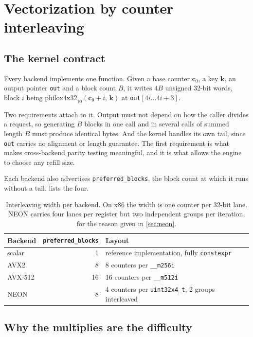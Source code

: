 \documentclass[acmsmall,screen,review]{acmart}
\theoremstyle{acmdefinition}
\newcommand{\ctr}{\mathbf{c}}
\newcommand{\key}{\mathbf{k}}
\newcommand{\code}[1]{\texttt{#1}}
\begin{document}
\section{Vectorization by counter interleaving}\label{sec:simd}

\subsection{The kernel contract}

Every backend implements one function. Given a base counter $\ctr_0$, a key
$\key$, an output pointer \code{out} and a block count $B$, it writes $4B$
unsigned 32-bit words, block $i$ being
$\mathrm{philox4x32}_{10}(\ctr_0 + i,\, \key)$ at \code{out}$[4i \ldots 4i+3]$.

Two requirements attach to it. Output must not depend on how the caller divides
a request, so generating $B$ blocks in one call and in several calls of
summed length $B$ must produce identical bytes. And the kernel handles its own
tail, since \code{out} carries no alignment or length guarantee. The first
requirement is what makes cross-backend parity testing meaningful, and it is
what allows the engine to choose any refill size.

Each backend also advertises \code{preferred\_blocks}, the block count at which
it runs without a tail.  lists the four.

\begin{table}[t]
\centering
\caption{Interleaving width per backend. On x86 the width is one counter per
32-bit lane. NEON carries four lanes per register but two independent groups
per iteration, for the reason given in \cref{sec:neon}.}\label{tab:widths}
\begin{tabular}{lrl}
\toprule
Backend & \code{preferred\_blocks} & Layout \\
\midrule
scalar   & 1  & reference implementation, fully \code{constexpr} \\
AVX2     & 8  & 8 counters per \code{\_\_m256i} \\
AVX-512  & 16 & 16 counters per \code{\_\_m512i} \\
NEON     & 8  & 4 counters per \code{uint32x4\_t}, 2 groups interleaved \\
\bottomrule
\end{tabular}
\end{table}

\subsection{Why the multiplies are the difficulty}
\end{document}
